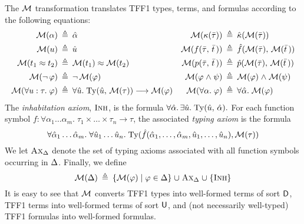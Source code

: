 The $\mathcal{M}$ transformation translates TFF1 types, terms, and formulas
according to the following equations:
\begin{align*}
\mathcal{M}(\alpha) &\:\triangleq\: \hat{\alpha} &
\mathcal{M}(\kappa(\bar{\tau})) &\:\triangleq\: \hat{\kappa}(\mathcal{M}(\bar{\tau})) \\
\mathcal{M}(u) &\:\triangleq\: \hat{u} &
\mathcal{M}(f(\bar{\tau},\,\bar{t}\,)) &\:\triangleq\: \hat{f}(\mathcal{M}(\bar{\tau}),\,\mathcal{M}(\bar{t}\,)) \\
\mathcal{M}(t_1 \approx t_2) &\:\triangleq\: \mathcal{M}(t_1) \approx \mathcal{M}(t_2) &
\mathcal{M}(p(\bar{\tau},\,\bar{t}\,)) &\:\triangleq\: \hat{p}(\mathcal{M}(\bar{\tau}),\,\mathcal{M}(\bar{t}\,)) \\
\mathcal{M}(\lnot\, \varphi) &\:\triangleq\: \lnot\, \mathcal{M}(\varphi) &
\mathcal{M}(\varphi \mathrel{\land} \psi) &\:\triangleq\: \mathcal{M}(\varphi) \mathrel{\land} \mathcal{M}(\psi) \\
\mathcal{M}(\forall u \mathrel{:} \tau .\; \varphi) &\:\triangleq\:
\forall \hat{u} .\; \mathrm{Ty}(\hat{u},\, \mathcal{M}(\tau)) \longrightarrow \mathcal{M}(\varphi) &
\mathcal{M}(\forall \alpha .\; \varphi) &\:\triangleq\:
\forall \hat{\alpha} .\; \mathcal{M}(\varphi)
\end{align*}
%
\newcommand{\AxD}{\text{\sc Ax}_{\DEL}}%
\newcommand{\Inh}{\text{\sc Inh}}%
\newcommand{\Dom}{\mathrm{Dom}}%
%
The {\em inhabitation axiom}, $\Inh$, is the formula
$\forall \hat{\alpha}.\, \exists \hat{u} .\;
\mathrm{Ty}(\hat{u},\,\hat{\alpha}).$
For each function symbol $f :
\forall \alpha_1\dots\alpha_m .\; \tau_1 \times \dots \times \tau_n \to \tau$,
the associated {\em typing axiom\/} is the formula
$$
\forall \hat{\alpha}_1\dots\hat{\alpha}_m .\;
\forall \hat{u}_1\dots\hat{u}_n .\;
\typeof(\hat{f}(\hat{\alpha}_1,\dots,\hat{\alpha}_m,
\hat{u}_1,\dots,\hat{u}_n), \MON(\tau))%
$$
We let $\AxD$ denote the set of typing axioms associated with all function
symbols occurring in $\mathrm{\Delta}$.
%
Finally, we define
$$
\MON(\DEL) \eqdef \{ \MON(\varphi) \vb \varphi \in \DEL \} \mathrel\cup
\AxD \mathrel\cup \{ \Inh \}%
$$
%
It is easy to see that $\mathcal{M}$ converts TFF1 types into well-formed
terms of sort $\mathsf{D}$, TFF1 terms into well-formed terms of sort $\mathsf{U}$,
and (not necessarily well-typed) TFF1 formulas into well-formed formulas.

